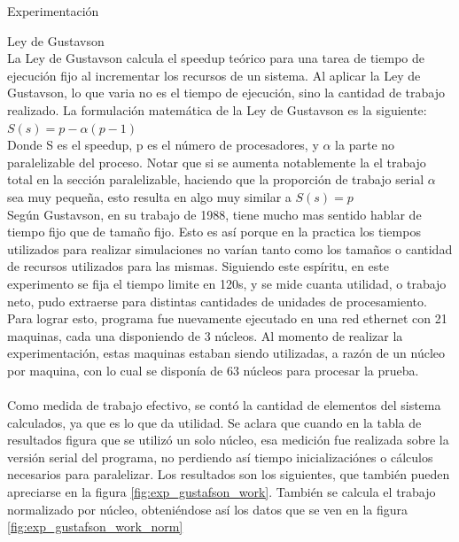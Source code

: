 \begin{section}{Experimentación}
\begin{subsection}{Ley de Gustavson}
~\\
La Ley de Gustavson calcula el speedup teórico para una tarea de tiempo de ejecución fijo al incrementar los recursos de un sistema. Al aplicar la Ley de Gustavson, lo que varia no es el tiempo de ejecución, sino la cantidad de trabajo realizado. La formulación matemática de la Ley de Gustavson es la siguiente:
~\\
{\centering
$S(s) = p - \alpha(p-1)$
}
~\\
Donde S es el speedup, p es el número de procesadores, y $\alpha$ la parte no paralelizable del proceso. Notar que si se aumenta notablemente la el trabajo total en la sección paralelizable, haciendo que la proporción de trabajo serial $\alpha$ sea muy pequeña, esto resulta en algo muy similar a $S(s) = p$
~\\
Según Gustavson, en su trabajo de 1988, tiene mucho mas sentido hablar de tiempo fijo que de tamaño fijo. Esto es así porque en la practica los tiempos utilizados para realizar simulaciones no varían tanto como los tamaños o cantidad de recursos utilizados para las mismas. Siguiendo este espíritu, en este experimento se fija el tiempo limite en 120s, y se mide cuanta utilidad, o trabajo neto, pudo extraerse para distintas cantidades de unidades de procesamiento.
~\\
Para lograr esto, programa fue nuevamente ejecutado en una red ethernet con 21 maquinas, cada una disponiendo de 3 núcleos. Al momento de realizar la experimentación, estas maquinas estaban siendo utilizadas, a razón de un núcleo por maquina, con lo cual se disponía de 63 núcleos para procesar la prueba. 
~\\
~\\
Como medida de trabajo efectivo, se contó la cantidad de elementos del sistema calculados, ya que es lo que da utilidad. Se aclara que cuando en la tabla de resultados figura que se utilizó un solo núcleo, esa medición fue realizada sobre la versión serial del programa, no perdiendo así tiempo inicializaciónes o cálculos necesarios para paralelizar. Los resultados son los siguientes, que también pueden apreciarse en la figura \ref{fig:exp_gustafson_work}. También se calcula el trabajo normalizado por núcleo, obteniéndose así los datos que se ven en la figura \ref{fig:exp_gustafson_work_norm}
~\\


\end{subsection}
\end{section}
